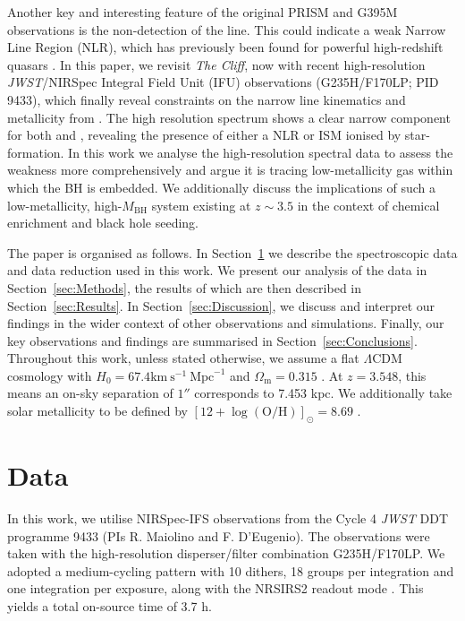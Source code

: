 \documentclass[fleqn,usenatbib]{mnras}
\newcommand{\jwst}{\textit{JWST}\xspace}
\newcommand{\Hbeta}{\text{H\textbeta}\xspace}
\newcommand{\cliff}{\textit{The Cliff}\xspace}
\begin{document}
Another key and interesting feature of the original PRISM and G395M observations is the non-detection of the \OIIIL line. 
This could indicate a weak Narrow Line Region (NLR), which has previously been found for powerful high-redshift quasars \citep{Netzer2004}. 
In this paper, we revisit \cliff, now with recent high-resolution \jwst/NIRSpec Integral Field Unit (IFU) observations (G235H/F170LP; PID 9433), which finally reveal constraints on the narrow line kinematics and metallicity from \OIIIL. 
The high resolution spectrum shows a clear narrow component for both \Hbeta and \OIIIL, revealing the presence of either a NLR or ISM ionised by star-formation. 
In this work we analyse the high-resolution spectral data to assess the \OIIIL weakness more comprehensively and argue it is tracing low-metallicity gas within which the BH is embedded. 
We additionally discuss the implications of such a low-metallicity, high-$M_\mathrm{BH}$ system existing at $z\sim3.5$ in the context of chemical enrichment and black hole seeding.

The paper is organised as follows. 
In Section~\ref{sec:data} we describe the spectroscopic data and data reduction used in this work. 
We present our analysis of the data in Section~\ref{sec:Methods}, the results of which are then described in Section~\ref{sec:Results}.
In Section~\ref{sec:Discussion}, we discuss and interpret our findings in the wider context of other observations and simulations. 
Finally, our key observations and findings are summarised in Section~\ref{sec:Conclusions}. 
Throughout this work, unless stated otherwise, we assume a flat $\Lambda$CDM cosmology with $H_0 = 67.4 \mathrm{km} \ \mathrm{s}^{-1} \ \mathrm{Mpc}^{-1}$ and $\Omega_\mathrm{m} = 0.315$ \citep{Planck2020}. 
At $z = 3.548$, this means an on-sky separation of $1''$ corresponds to 7.453 kpc.
We additionally take solar metallicity to be defined by $[12+\log(\mathrm{O/H})]_\odot = 8.69$ \citep{Asplund2009}.


\section{Data}\label{sec:data}

In this work, we utilise NIRSpec-IFS observations from the Cycle 4 \jwst DDT programme 9433 (PIs R. Maiolino and F. D'Eugenio). 
The observations were taken with the high-resolution disperser/filter combination G235H/F170LP. We adopted a medium-cycling pattern with 10 dithers, 18 groups per integration and one integration per exposure, along with the NRSIRS2 readout mode \citep{Rauscher2017}. This yields a total on-source time of 3.7 h.
\end{document}
